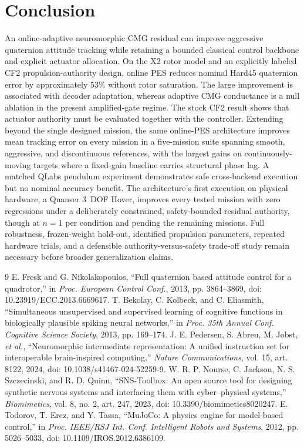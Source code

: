 \documentclass[10pt,twocolumn]{article}
\begin{document}
\section{Conclusion}

An online-adaptive neuromorphic CMG residual can improve aggressive
quaternion attitude tracking while retaining a bounded classical control
backbone and explicit actuator allocation. On the X2 rotor model and an
explicitly labeled CF2 propulsion-authority design, online PES reduces nominal
Hard45 quaternion error by approximately 53\% without rotor saturation. The
large improvement is associated with decoder adaptation, whereas adaptive CMG
conductance is a null ablation in the present amplified-gate regime.
The stock CF2 result shows that actuator authority must be evaluated together
with the controller. Extending beyond the single designed mission, the same
online-PES architecture improves mean tracking error on every mission in a
five-mission suite spanning smooth, aggressive, and discontinuous references,
with the largest gains on continuously-moving targets where a fixed-gain
baseline carries structural phase lag. A matched QLabs pendulum experiment
demonstrates safe cross-backend execution but no nominal accuracy benefit.
The architecture's first execution on physical hardware, a Quanser 3~DOF
Hover, improves every tested mission with zero regressions under a
deliberately constrained, safety-bounded residual authority, though at
$n=1$ per condition and pending the remaining missions. Full robustness,
frozen-weight hold-out, identified propulsion parameters, repeated hardware
trials, and a defensible authority-versus-safety trade-off study remain
necessary before broader generalization claims.

\begin{thebibliography}{9}
E. Fresk and G. Nikolakopoulos, ``Full quaternion based attitude control for a
quadrotor,'' in \emph{Proc. European Control Conf.}, 2013, pp. 3864--3869,
doi: 10.23919/ECC.2013.6669617.
T. Bekolay, C. Kolbeck, and C. Eliasmith, ``Simultaneous unsupervised and
supervised learning of cognitive functions in biologically plausible spiking
neural networks,'' in \emph{Proc. 35th Annual Conf. Cognitive Science Society},
2013, pp. 169--174.
J. E. Pedersen, S. Abreu, M. Jobst, \emph{et al.}, ``Neuromorphic
intermediate representation: A unified instruction set for interoperable
brain-inspired computing,'' \emph{Nature Communications}, vol. 15, art. 8122,
2024, doi: 10.1038/s41467-024-52259-9.
W. R. P. Nourse, C. Jackson, N. S. Szczecinski, and R. D. Quinn,
``SNS-Toolbox: An open source tool for designing synthetic nervous systems and
interfacing them with cyber--physical systems,'' \emph{Biomimetics}, vol. 8,
no. 2, art. 247, 2023, doi: 10.3390/biomimetics8020247.
E. Todorov, T. Erez, and Y. Tassa, ``MuJoCo: A physics engine for model-based
control,'' in \emph{Proc. IEEE/RSJ Int. Conf. Intelligent Robots and Systems},
2012, pp. 5026--5033, doi: 10.1109/IROS.2012.6386109.
\end{thebibliography}
\end{document}
